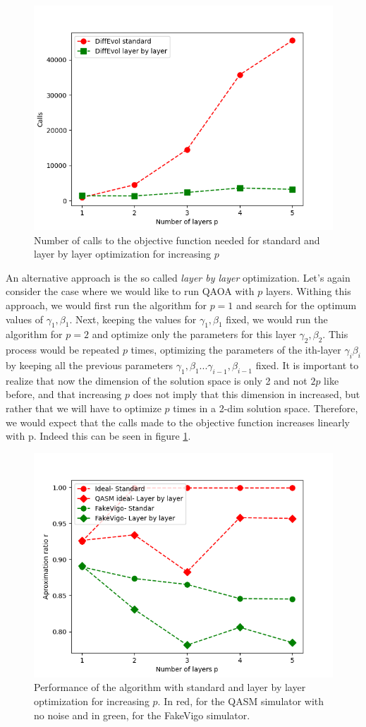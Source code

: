 \begin{figure}[h]
    \centering
    \includegraphics[width=0.5\linewidth]{images/Calls.png}    
    \caption{Number of calls to the objective function needed for standard and layer by layer optimization for increasing $p$}
    \label{calls}
\end{figure}

An alternative approach is the so called \textit{layer by layer} optimization. Let's again consider the case where we would like to run QAOA with $p$ layers. Withing this approach, we would first run the algorithm for $p=1$ and search for the optimum values of $\gamma_1, \beta_1$. Next, keeping the values for $\gamma_1, \beta_1$ fixed, we would run the algorithm for $p=2$ and optimize only the parameters for this layer $\gamma_2, \beta_2$. This process would be repeated $p$ times, optimizing the parameters of the ith-layer $\gamma_i \beta_i$ by keeping all the previous parameters  $\gamma_1, \beta_1 ... \gamma_{i-1}, \beta_{i-1}$ fixed. It is important to realize that now the dimension of the solution space is only 2 and not $2p$ like before, and that increasing $p$ does not imply that this dimension in increased, but rather that we will have to optimize $p$ times in a 2-dim solution space. Therefore, we would expect that the calls made to the objective function increases linearly with p. Indeed this can be seen in figure \ref{calls}.


\begin{figure}
    \centering
    \includegraphics[width=0.6\linewidth]{images/layer by layer vs standard performance.png}
    \caption{Performance of the algorithm with standard and layer by layer optimization for increasing $p$. In red, for the QASM simulator with no noise and in green, for the FakeVigo simulator.}
    \label{performance layer standard}
\end{figure}

